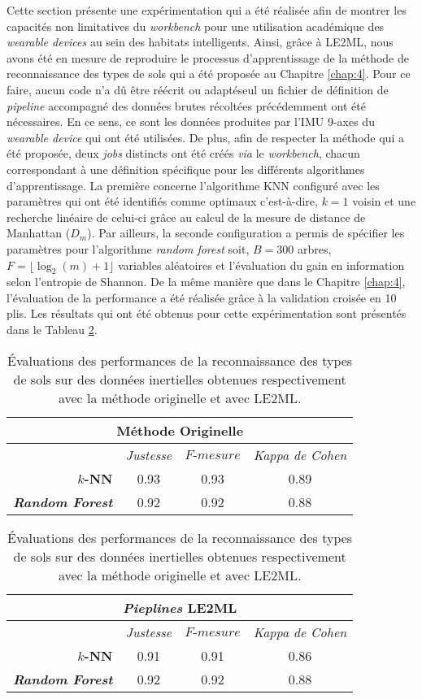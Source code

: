 Cette section présente une expérimentation qui a été réalisée afin de montrer les capacités non limitatives du \textit{workbench} pour une utilisation académique des \textit{wearable devices} au sein des habitats intelligents. Ainsi, grâce à \acs{LE2ML}, nous avons été en mesure de reproduire le processus d'apprentissage de la méthode de reconnaissance des types de sols qui a été proposée au Chapitre \ref{chap:4}. Pour ce faire, aucun code n'a dû être réécrit ou adapté\textemdash seul un fichier de définition de \textit{pipeline} accompagné des données brutes récoltées précédemment ont été nécessaires. En ce sens, ce sont les données produites par l'\acs{IMU} 9-axes du \textit{wearable device} qui ont été utilisées. De plus, afin de respecter la méthode qui a été proposée, deux \textit{jobs} distincts ont été créés \textit{via} le \textit{workbench}, chacun correspondant à une définition spécifique pour les différents algorithmes d'apprentissage. La première concerne l'algorithme \acs{KNN} configuré avec les paramètres qui ont été identifiés comme optimaux c'est-à-dire, $k=1$ voisin et une recherche linéaire de celui-ci grâce au calcul de la mesure de distance de Manhattan ($D_m$). Par ailleurs, la seconde configuration a permis de spécifier les paramètres pour l'algorithme \textit{random forest} soit, $B=300$ arbres, $F=\lfloor\log_2(m) + 1\rfloor$ variables aléatoires et l'évaluation du gain en information selon l'entropie de Shannon. De la même manière que dans le Chapitre \ref{chap:4}, l'évaluation de la performance a été réalisée grâce à la validation croisée en 10 plis. Les résultats qui ont été obtenus pour cette expérimentation sont présentés dans le Tableau \ref{tab:results_workbench}.

\begin{table}[H]
  \centering
  \caption{Évaluations des performances de la reconnaissance des types de sols sur des données inertielles obtenues respectivement avec la méthode originelle et avec \acs{LE2ML}.}
  \label{tab:results_workbench}
  \begin{tabular}{@{}rccc@{}}
    \toprule
      \multicolumn{4}{c}{\textbf{Méthode Originelle}} \\
    \midrule
      \multicolumn{1}{l}{} & \textit{Justesse} & $F\mbox{-} mesure$ & \textit{Kappa de Cohen} \\[-10pt]
      \textbf{$k$-NN} & 0.93 & 0.93 & 0.89 \\[-10pt]
      \textbf{\textit{Random Forest}} & 0.92 & 0.92 & 0.88 \\
    \bottomrule
  \end{tabular}
  \begin{tabular}{@{}rccc@{}}
      \multicolumn{4}{c}{\textbf{\textit{Pieplines} \acs{LE2ML}}} \\
    \midrule
      \multicolumn{1}{l}{} & \textit{Justesse} & $F\mbox{-} mesure$ & \textit{Kappa de Cohen} \\[-10pt]
      \textbf{$k$-NN} & 0.91 & 0.91 & 0.86 \\[-10pt]
      \textbf{\textit{Random Forest}} & 0.92 & 0.92 & 0.88 \\
    \bottomrule
  \end{tabular}
\end{table}

